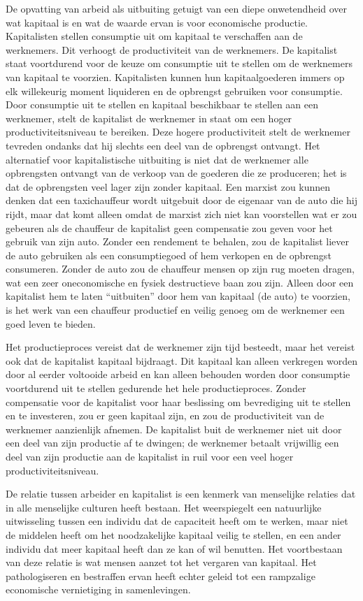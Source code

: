 De opvatting van arbeid als uitbuiting getuigt van een diepe
onwetendheid over wat kapitaal is en wat de waarde ervan is voor
economische productie. Kapitalisten stellen consumptie uit om kapitaal
te verschaffen aan de werknemers. Dit verhoogt de productiviteit van de
werknemers. De kapitalist staat voortdurend voor de keuze om consumptie
uit te stellen om de werknemers van kapitaal te voorzien. Kapitalisten
kunnen hun kapitaalgoederen immers op elk willekeurig moment liquideren
en de opbrengst gebruiken voor consumptie. Door consumptie uit te
stellen en kapitaal beschikbaar te stellen aan een werknemer, stelt de
kapitalist de werknemer in staat om een hoger productiviteitsniveau te
bereiken. Deze hogere productiviteit stelt de werknemer tevreden ondanks
dat hij slechts een deel van de opbrengst ontvangt. Het alternatief voor
kapitalistische uitbuiting is niet dat de werknemer alle opbrengsten
ontvangt van de verkoop van de goederen die ze produceren; het is dat de
opbrengsten veel lager zijn zonder kapitaal. Een marxist zou kunnen
denken dat een taxichauffeur wordt uitgebuit door de eigenaar van de
auto die hij rijdt, maar dat komt alleen omdat de marxist zich niet kan
voorstellen wat er zou gebeuren als de chauffeur de kapitalist geen
compensatie zou geven voor het gebruik van zijn auto. Zonder een
rendement te behalen, zou de kapitalist liever de auto gebruiken als een
consumptiegoed of hem verkopen en de opbrengst consumeren. Zonder de
auto zou de chauffeur mensen op zijn rug moeten dragen, wat een zeer
oneconomische en fysiek destructieve baan zou zijn. Alleen door een
kapitalist hem te laten \enquote{uitbuiten}
door hem van kapitaal (de auto) te voorzien, is het werk van een
chauffeur productief en veilig genoeg om de werknemer een goed leven te
bieden.

Het productieproces vereist dat de werknemer zijn tijd besteedt, maar
het vereist ook dat de kapitalist kapitaal bijdraagt. Dit kapitaal kan
alleen verkregen worden door al eerder voltooide arbeid en kan alleen
behouden worden door consumptie voortdurend uit te stellen gedurende het
hele productieproces. Zonder compensatie voor de kapitalist voor haar
beslissing om bevrediging uit te stellen en te investeren, zou er geen
kapitaal zijn, en zou de productiviteit van de werknemer aanzienlijk
afnemen. De kapitalist buit de werknemer niet uit door een deel van zijn
productie af te dwingen; de werknemer betaalt vrijwillig een deel van
zijn productie aan de kapitalist in ruil voor een veel hoger
productiviteitsniveau.

De relatie tussen arbeider en kapitalist is een kenmerk van menselijke
relaties dat in alle menselijke culturen heeft bestaan. Het weerspiegelt
een natuurlijke uitwisseling tussen een individu dat de capaciteit heeft
om te werken, maar niet de middelen heeft om het noodzakelijke kapitaal
veilig te stellen, en een ander individu dat meer kapitaal heeft dan ze
kan of wil benutten. Het voortbestaan van deze relatie is wat mensen
aanzet tot het vergaren van kapitaal. Het pathologiseren en bestraffen
ervan heeft echter geleid tot een rampzalige economische vernietiging in
samenlevingen.
